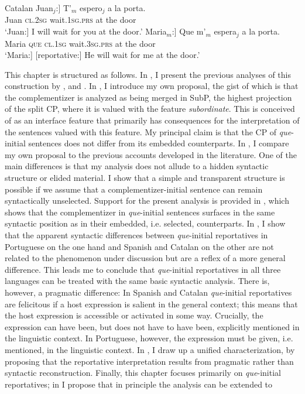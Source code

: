 \ea\label{ex:origosw} Catalan
\ea\label{ex:origoswa} 
\gll {\ob}Juan$_j$:] T'$_m$ espero$_j$ a la porta. \\
		Juan \textsc{cl.2sg} wait.\textsc{1sg.prs} at the door\\
		\glt `{\ob}Juan:] I will wait for you at the door.'
		\ex\label{ex:origoswb}
		\gll {\ob}Maria$_m$:] Que m'$_m$ espera$_j$ a la porta. \\ 
		Maria \textsc{que} \textsc{cl.1sg} wait.\textsc{3sg.prs} at the door\\
		\glt `{\ob}Maria:] [reportative:] He will wait for me at the door.'
	\z
\z



This chapter is structured as follows. In , I present the previous analyses of this construction  by \citet{DemonteSoriano2014}, \citet{Etxepare2007,Etxepare2010,Etxepare2013} and \citet{Corr2016}.  In , I introduce my own proposal, the gist of which is that the complementizer is analyzed as being merged in SubP, the highest projection of the split CP, where it is  valued with the feature \emph{subordinate}. This is conceived of as an interface feature that primarily has  consequences for the interpretation of the  sentences valued with this feature.  My principal claim is that the CP of \emph{que}-initial sentences does not differ from its embedded counterparts. In , I  compare my own proposal to the previous accounts developed in the literature. One of the main differences is that my analysis does not allude to a hidden syntactic structure or elided material. I show that a simple and transparent structure is possible if we assume that a complementizer-initial sentence can remain syntactically unselected.   Support for the present analysis is provided in ,  which shows  that the complementizer in \emph{que}-initial sentences surfaces in the same syntactic position as in their embedded, i.e. selected, counterparts.  In , I show that the apparent  syntactic  differences between \emph{que}-initial reportatives in Portuguese on the one hand and  Spanish and Catalan  on the other are not related to the phenomenon under discussion but are a reflex of a more general difference. This leads me to conclude that \emph{que}-initial reportatives in all three languages can be treated with the same basic syntactic analysis. There is, however, a pragmatic difference:  In Spanish and Catalan  \emph{que}-initial reportatives are felicitous if a host expression is  salient in the general context; this means that the host expression  is accessible or activated in some way. Crucially,  the expression can have been, but does not have to have been, explicitly mentioned in the linguistic context. In Portuguese, however, the expression must be given, i.e. mentioned, in the linguistic context. In , I draw up a unified characterization, by proposing that the reportative interpretation results from pragmatic rather than syntactic reconstruction.  Finally, this chapter focuses primarily on \emph{que}-initial reportatives; in  I propose that in principle the analysis can be extended to
